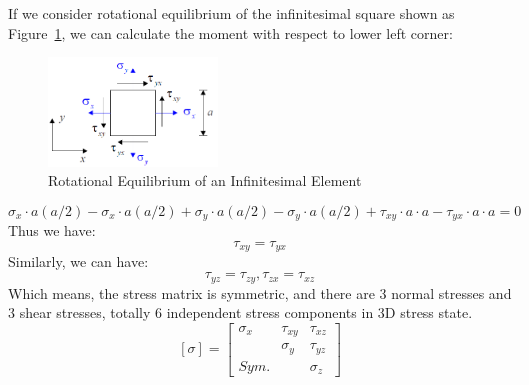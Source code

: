 \documentclass[en,hazy,cyan,8pt,normal]{elegantnote}
\begin{document}
    If we consider rotational equilibrium of the infinitesimal square shown as Figure~\ref{fig:004}, we can calculate the moment with respect to lower left corner:
    \begin{figure}[H]
      \centering
      \includegraphics[width=0.4\textwidth]{image/004.png}
      \caption{Rotational Equilibrium of an Infinitesimal Element}
      \label{fig:004}
    \end{figure}
    \begin{equation}\label{eq:004}
      \sigma_x\cdot a (a/2)-\sigma_x\cdot a (a/2)+\sigma_y\cdot a (a/2)-\sigma_y\cdot a (a/2)+\tau_{xy}\cdot a \cdot a - \tau_{yx}\cdot a \cdot a=0
    \end{equation}
    Thus we have:
    \begin{equation}\label{eq:005}
      \tau_{xy}=\tau_{yx}
    \end{equation}
    Similarly, we can have:
    \begin{equation}\label{eq:006}
      \tau_{yz}=\tau_{zy}, \tau_{zx}=\tau_{xz}
    \end{equation}
    Which means, the stress matrix is symmetric, and there are 3 normal stresses and 3 shear stresses, totally 6 independent stress components in 3D stress state.
    \begin{equation}\label{eq:007}
      [\sigma]=
      \begin{bmatrix}
        \sigma_x & \tau_{xy} & \tau_{xz}\\
          & \sigma_y & \tau_{yz}\\
        Sym. &   & \sigma_z
      \end{bmatrix}
    \end{equation}
\end{document}

